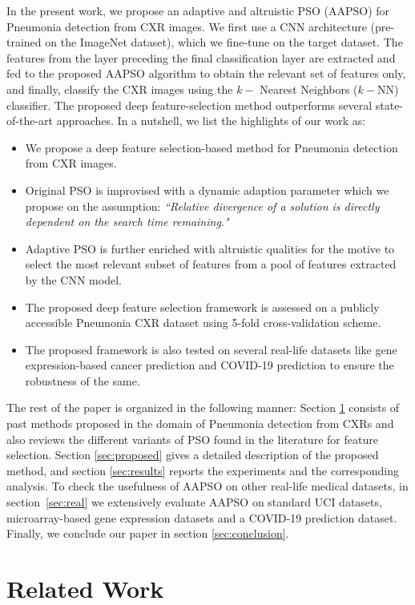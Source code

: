 \documentclass[final,3p,times]{elsarticle}
\begin{document}
In the present work, we propose an adaptive and altruistic PSO (AAPSO) for Pneumonia detection from CXR images. We first use a CNN architecture (pre-trained on the ImageNet dataset), which {we fine-tune} on the target dataset. The features from the layer preceding the final classification layer are extracted and fed to the proposed AAPSO algorithm to obtain the relevant set of features only, and finally, classify {the CXR images} using the $k-$ Nearest Neighbors ($k-$NN) classifier. The proposed deep {feature-selection} method outperforms several state-of-the-art approaches. In a nutshell, {we list} the highlights of our work as:
\begin{itemize}
   \item {We propose a deep feature selection-based method for Pneumonia detection from CXR images.}
   \item {Original PSO is improvised with a dynamic adaption parameter which we propose on the assumption: \textit{``Relative divergence of a solution is directly dependent on the search time remaining."}}
   \item {Adaptive PSO is further enriched with altruistic qualities for the motive to select the most relevant subset of features from a pool of features extracted by the CNN model.}
   \item {The proposed deep feature selection framework is assessed on a publicly accessible Pneumonia CXR dataset using 5-fold cross-validation scheme.}
   \item {The proposed framework is also tested on several real-life datasets like gene expression-based cancer prediction and COVID-19 prediction to ensure the robustness of the same.}
\end{itemize}
The rest of the paper is organized in the following manner: Section \ref{sec:related} consists of {past methods proposed} in the domain of Pneumonia detection from CXRs and also reviews the different variants of PSO found in the literature for feature selection. Section \ref{sec:proposed} gives a detailed description of the proposed method, and section \ref{sec:results} reports the experiments and the corresponding analysis. To check the usefulness of AAPSO on other real-life medical datasets, in section~\ref{sec:real} we extensively evaluate AAPSO on standard UCI datasets, {microarray-based} gene expression datasets and a COVID-19 prediction dataset. Finally, we conclude our paper in section \ref{sec:conclusion}.
\section{Related Work}
\label{sec:related}
\end{document}
